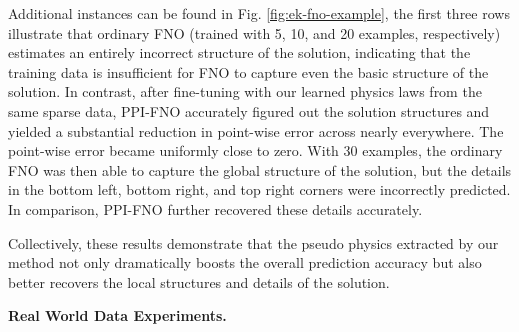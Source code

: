 Additional instances can be found in Fig. \ref{fig:ek-fno-example}, the first three rows illustrate that ordinary FNO (trained with 5, 10, and 20 examples, respectively) estimates an entirely incorrect structure of the solution, indicating that the training data is insufficient for FNO to capture even the basic structure of the solution. In contrast, after fine-tuning with our learned physics laws from the same sparse data, PPI-FNO accurately figured out the solution structures and yielded a substantial reduction in point-wise error across nearly everywhere. The point-wise error became uniformly close to zero.
With 30 examples, the ordinary FNO was then able to capture the global structure of the solution, but the details in the bottom left, bottom right, and top right corners were incorrectly predicted. In comparison, PPI-FNO further recovered these details accurately. 




Collectively, these results demonstrate that the pseudo physics extracted by our method not only dramatically boosts the overall prediction accuracy but also better recovers the local structures and details of the solution.

\textbf{Real World Data Experiments.} 

